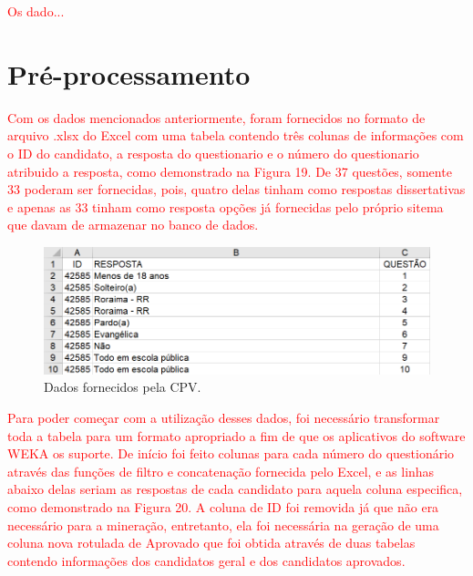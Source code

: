 \label{chapter:projeto}

\par
\textcolor{red}{Os dado...}

\section{Pré-processamento}

\par
\textcolor{red}{Com os dados mencionados anteriormente, foram fornecidos no formato de arquivo .xlsx do Excel com uma tabela contendo três colunas de informações com o ID do candidato, a resposta do questionario e o número do questionario atribuido a resposta, como demonstrado na Figura 19. De 37 questões, somente 33 poderam ser fornecidas, pois, quatro delas tinham como respostas dissertativas e apenas as 33 tinham como resposta opções já fornecidas pelo próprio sitema que davam de armazenar no banco de dados.}

\par
\begin{figure}[!htp]
	\begin{center}
    \caption{\label{fig:waveform_fig} Dados fornecidos pela CPV.}
	\includegraphics[scale=0.65]{Figuras/Formato_errado.png}
	\end{center}
\end{figure}

\par
\textcolor{red}{Para poder começar com a utilização desses dados, foi necessário transformar toda a tabela para um formato apropriado a fim de que os aplicativos do software WEKA os suporte. De início foi feito colunas para cada número do questionário através das funções de filtro e concatenação fornecida pelo Excel, e as linhas abaixo delas seriam as respostas de cada candidato para aquela coluna especifica, como demonstrado na Figura 20. A coluna de ID foi removida já que não era necessário para a mineração, entretanto, ela foi necessária na geração de uma coluna nova rotulada de Aprovado que foi obtida através de duas tabelas contendo informações dos candidatos geral e dos candidatos aprovados.}

